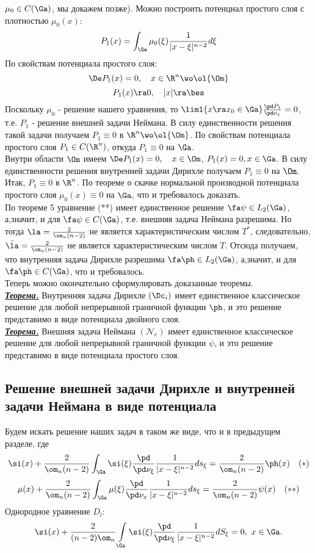 \documentclass[a4paper,draft]{article}
\begin{document}
$\mu_0\in C(\Ga)$, мы докажем позже). Можно построить потенциал
простого слоя с плотностью $\mu_0(x)$:
$$
P_1(x)=\int_{\Ga}\mu_0(\xi)\frac{1}{|x-\xi|^{n-2}}d\xi
$$
По свойствам потенциала простого слоя:
$$
\De P_1(x)=0,\quad x\in\R^n\wo\ol{\Om}
$$
$$
P_1(x)\ra 0,\quad |x|\ra\bes
$$
Поскольку $\mu_0$ - решение нашего уравнения, то $\liml{x\ra
x_0\in\Ga}\frac{\pd P_1}{\pd\nu_x}=0$, т.е. $P_1$ -
решение внешней задачи Неймана. В силу единственности решения
такой задачи получаем $P_1\equiv 0$ в
$\R^n\wo\ol{\Om}$. По свойствам потенциала
простого слоя $P_1\in C(\R^n)$, откуда $P_1\equiv 0$ на
$\Ga$.\\
Внутри области $\Om$ имеем $\De P_1(x)=0,\quad x\in\Om$,
$P_1(x)=0, x\in\Ga$. В силу единственности решения внутренней
задачи Дирихле получаем $P_1\equiv 0$ на $\Om$.\\
Итак, $P_1\equiv 0$ в $\R^n$. По теореме о скачке
нормальной производной потенциала простого слоя $\mu_0(x)\equiv 0$
на $\Ga$, что и требовалось доказать.\\
По теореме 5 уравнение (**) имеет единственное решение $\fa
\psi \in L_2(\Ga)$, а,значит, и для $\fa \psi \in
C(\Ga)$, т.е. внешняя задача Неймана разрешима. Но тогда
$\la=\frac{2}{\om_n(n-2)}$ не является характеристическим
числом $T^*$, следовательно,
$\bar{\la}=\frac{2}{\om_n(n-2)}$ не является
характеристическим числом $T$. Отсюда получаем, что внутренняя
задача Дирихле разрешима $\fa \ph \in L_2(\Ga)$,
а,значит, и для $\fa \ph \in C(\Ga)$, что и
требовалось.\\
Теперь можно окончательно сформулировать доказанные теоремы.\\
\underline{\textit{\textbf{Теорема.}}} Внутренняя задача Дирихле
$(\Dc_i)$ имеет единственное классическое решение для
любой непрерывной граничной функции $\ph$, и это решение
представимо в виде потенциала двойного слоя.\\
\underline{\textit{\textbf{Теорема.}}} Внешняя задача Неймана
$(\mathcal{N}_e)$ имеет единственное классическое решение для
любой непрерывной граничной функции $\psi$, и это решение
представимо в виде потенциала простого слоя.
\subsection{Решение внешней задачи Дирихле и внутренней задачи Неймана в виде потенциала}
Будем искать решение наших задач в таком же виде, что и в
предыдущем разделе, где
$$
\si(x)+\frac{2}{\om_n(n-2)}\int_{\Ga}\si(\xi)\frac{\pd}{\pd\nu_{\xi}}\frac{1}{|x-\xi|^{n-2}}ds_{\xi}=
\frac{2}{\om_n(n-2)}\ph(x)\quad (*)
$$
$$
\mu(x)+\frac{2}{\om_n(n-2)}\int_{\Ga}\mu(\xi)\frac{\pd}{\pd\nu_x}\frac{1}{|x-\xi|^{n-2}}ds_{\xi}=
\frac{2}{\om_n(n-2)}\psi(x)\quad(**)
$$
Однородное уравнение  $D_l$:
$$
\si(x)+\frac{2}{(n-2)\om_n}\int\limits_\Ga \si(\xi)\frac{\pd}{\pd \nu_\xi}
\frac{1}{|x-\xi|^{n-2}}dS_\xi = 0,\ x\in\Ga.
$$
\end{document}
